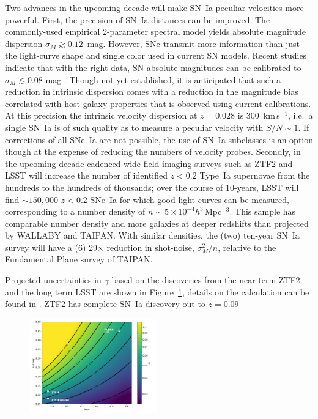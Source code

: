 \documentclass[11pt, oneside]{article}   	%
\begin{document}
Two advances in the upcoming decade will make SN~Ia peculiar velocities more powerful.
First, the precision of SN~Ia distances can be improved.  The commonly-used empirical 2-parameter spectral model yields  absolute magnitude
dispersion $\sigma_M \gtrsim 0.12$~mag.  However, SNe transmit more information than just the light-curve shape and single color used in current SN models.
Recent studies indicate that with the right data, SN absolute
magnitudes can be calibrated to $\sigma_M \lesssim 0.08$ mag \cite[see e.g.][]{2012MNRAS.425.1007B, 2015ApJ...815...58F}. 
Though not yet
established, it is anticipated that such a reduction in intrinsic dispersion comes with a reduction in the magnitude bias correlated with host-galaxy properties
that is observed using current calibrations.  At this precision the intrinsic velocity dispersion  at $z=0.028$ is  $300$~km\,s$^{-1}$, i.e.\ a single SN~Ia  is of such quality as to
measure a peculiar velocity with $S/N \sim 1$.
 If corrections of all SNe~Ia are not possible, the use of SN~Ia subclasses is an option though at the expense of reducing the
numbers of velocity probes.
Secondly,  in the upcoming decade cadenced wide-field imaging surveys such as ZTF2 and LSST
  will increase the number of identified  $z<0.2$ Type~Ia supernovae from the hundreds to the
hundreds of thousands; over the course of 10-years, LSST will find $\sim150,000$ $z<0.2$ SNe~Ia
 for which good light curves can be measured, corresponding to a  number density of $n \sim 5\times 10^{-4}h^3$\,Mpc$^{-3}$.
  This sample has comparable
 number density and more galaxies at deeper redshifts than projected by WALLABY and TAIPAN.  With similar densities,
 the (two) ten-year SN~Ia survey will have
 a (6) 29$\times$ reduction in shot-noise, $\sigma^2_M/n$, relative to the Fundamental Plane survey of TAIPAN.



Projected uncertainties in $\gamma$ based on the discoveries from the near-term ZTF2 and the long term LSST are shown in Figure~\ref{surface:fig}, details
on the calculation can be found in \cite{2019BAAS...51c.140K}.
ZTF2 has complete SN~Ia discovery out to $z=0.09$ 

\begin{figure}
\centering
\includegraphics[width=0.49\textwidth]{src/surface1.pdf}
\caption{
\label{surface:fig}}
\end{figure}
\end{document}
